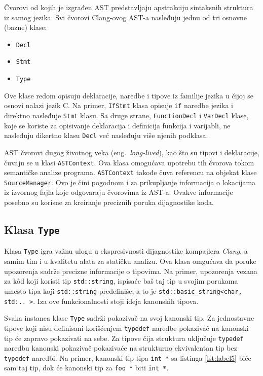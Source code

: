 \documentclass[12pt,oneside]{memoir}
\begin{document}
\v{C}vorovi od kojih je izgrađen AST predstavljaju apstrakciju sintaksnih struktura iz samog jezika.
Svi \v{c}vorovi Clang-ovog AST-a nasleđuju jednu od tri osnovne (bazne) klase:
\begin{itemize}
  \item \texttt{Decl}
  \item \texttt{Stmt}
  \item \texttt{Type}
\end{itemize}
Ove klase redom opisuju deklaracije, naredbe i tipove iz familije jezika u \v{c}ijoj se osnovi nalazi jezik C.
Na primer, \texttt{IfStmt} klasa opisuje \texttt{if} naredbe jezika i direktno nasleđuje \texttt{Stmt} klasu. Sa druge strane, \texttt{FunctionDecl} i \texttt{VarDecl} klase, koje se koriste za opisivanje deklaracija i definicija funkcija i varijabli, ne nasleđuju dikertno klasu \texttt{Decl} ve\'{c} nasleđuju vi\v{s}e njenih podklasa.
\par
AST \v{c}vorovi dugog \v{z}ivotnog veka (eng.~\textit{long-lived}), kao \v{s}to su tipovi i deklaracije, \v{c}uvaju se u klasi \texttt{ASTContext}. Ova klasa
omogu\'{c}ava upotrebu tih \v{c}vorova tokom semanti\v{c}ke analize programa. \texttt{ASTContext} takođe \v{c}uva referencu na objekat klase \texttt{SourceManager}. Ovo je
\v{c}ini pogodnom i za prikupljanje informacija o lokacijama iz izvornog fajla koje odgovaraju \v{c}vorovima iz AST-a. Ovakve informacije posebno su korisne za kreiranje
preciznih poruka dijagnostike koda.

\subsection{Klasa \texttt{Type}}
  Klasa \texttt{Type} igra va\v{z}nu ulogu u ekspresivnosti dijagnostike kompajlera \textit{Clang}, a samim tim i u kvalitetu alata za stati\v{c}ku analizu. Ova klasa omgu\'{c}ava da poruke upozorenja sadr\v{z}e precizne informacije o tipovima. Na primer, upozorenja vezana za k\^{o}d koji koristi tip \texttt{std::string}, ispisa\'{c}e ba\v{s} taj tip u svojim porukama umesto tipa koji \texttt{std::string} predefini\v{s}e, a to je \texttt{std::basic\_string<char, std:.. >}. Iza ove funkcionalnosti stoji ideja kanonskih tipova.
  
  \par
  Svaka instanca klase \texttt{Type} sadr\v{z}i pokaziva\v{c} na svoj kanonski tip. Za jednostavne tipove koji nisu definisani kori\v{s}\'{c}enjem \texttt{typedef} naredbe pokaziva\v{c} na kanonski tip \'{c}e zapravo pokazivati na sebe. Za tipove \v{c}ija struktura uklju\v{c}uje \texttt{typedef} naredbu kanonski pokaziva\v{c} pokaziva\'{c}e na strukturno ekvivalentan tip bez \texttt{typedef} naredbi.
  Na primer, kanonski tip tipa \texttt{int *} sa listinga \ref{lst:label5}  bi\'{c}e sam taj tip, dok \'{c}e kanonski tip za \texttt{foo *} biti \texttt{int *}.
\end{document}
